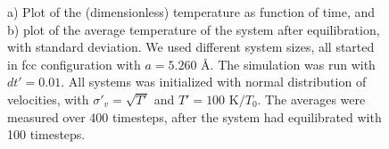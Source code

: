 \begin{figure}
  \begin{center}
  \parbox{5in} {
      \caption {
          \small {
              a) Plot of the (dimensionless) temperature as function of time, and b) plot of the average temperature of the system after equilibration, with standard deviation. We used different system sizes, all started in fcc configuration with $a = 5.260$ \AA. The simulation was run with $dt' = 0.01$. All systems was initialized with normal distribution of velocities, with $\sigma'_v = \sqrt{T'}$ and $T' = 100$ K$/T_0$. The averages were measured over 400 timesteps, after the system had equilibrated with 100 timesteps.
          }
          \label{fig:k}
      }
  }
  \end{center}
\end{figure}

